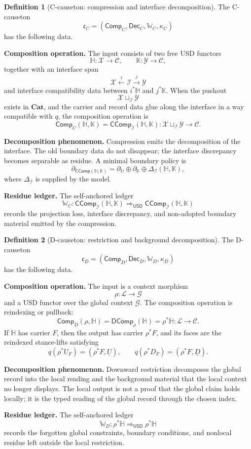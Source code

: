 \documentclass[11pt]{article}
\newcommand{\USD}{\mathsf{USD}}
\newcommand{\CComp}{\mathsf{CComp}}
\newcommand{\DComp}{\mathsf{DComp}}
\newcommand{\Comp}{\mathsf{Comp}}
\newcommand{\Dec}{\mathsf{Dec}}
\newcommand{\Cat}{\mathbf{Cat}}
\theoremstyle{definition}
\newtheorem{definition}{Definition}[section]
\theoremstyle{plain}
\begin{document}
\begin{definition}[C-causeton: compression and interface decomposition]
The C-causeton
\[
  \mathfrak c_C
  =
  (\Comp_C,\Dec_C,\mathbb W_C,\kappa_C)
\]
has the following data.

\textbf{Composition operation.}  The input consists of two free USD
functors
\[
  \mathbb H:\mathcal X\to\mathcal C,
  \qquad
  \mathbb K:\mathcal Y\to\mathcal C,
\]
together with an interface span
\[
  \mathcal X\xleftarrow{i}\mathcal I\xrightarrow{j}\mathcal Y
\]
and interface compatibility data between $i^*\mathbb H$ and
$j^*\mathbb K$.  When the pushout
\[
  \mathcal X\sqcup_{\mathcal I}\mathcal Y
\]
exists in $\Cat$, and the carrier and record data glue along the
interface in a way compatible with $q$, the composition operation is
\[
  \Comp_C(\mathbb H,\mathbb K)
  =
  \CComp_{\mathcal I}(\mathbb H,\mathbb K):
  \mathcal X\sqcup_{\mathcal I}\mathcal Y\to\mathcal C.
\]

\textbf{Decomposition phenomenon.}  Compression emits the decomposition
of the interface.  The old boundary data do not disappear; the interface
discrepancy becomes separable as residue.  A minimal boundary policy is
\[
  \partial_{\CComp(\mathbb H,\mathbb K)}
  =
  \partial_{\mathbb H}\oplus
  \partial_{\mathbb K}\oplus
  \Delta_{\mathcal I}(\mathbb H,\mathbb K),
\]
where $\Delta_{\mathcal I}$ is supplied by the model.

\textbf{Residue ledger.}  The self-anchored ledger
\[
  \mathbb W_C:
  \CComp_{\mathcal I}(\mathbb H,\mathbb K)
  \Rightarrow_{\USD}
  \CComp_{\mathcal I}(\mathbb H,\mathbb K)
\]
records the projection loss, interface discrepancy, and non-adopted
boundary material emitted by the compression.
\end{definition}

\begin{definition}[D-causeton: restriction and background decomposition]
The D-causeton
\[
  \mathfrak c_D
  =
  (\Comp_D,\Dec_D,\mathbb W_D,\kappa_D)
\]
has the following data.

\textbf{Composition operation.}  The input is a context morphism
\[
  \rho:\mathcal L\to\mathcal G
\]
and a USD functor over the global context $\mathcal G$.  The composition
operation is reindexing or pullback:
\[
  \Comp_D(\rho,\mathbb H)
  =
  \DComp_{\rho}(\mathbb H)
  =
  \rho^*\mathbb H:
  \mathcal L\to\mathcal C.
\]
If $\mathbb H$ has carrier $F$, then the output has carrier $\rho^*F$,
and its faces are the reindexed stance-lifts satisfying
\[
  q(\rho^*U_F)=(\rho^*F,\underline U),
  \qquad
  q(\rho^*D_F)=(\rho^*F,\underline D).
\]

\textbf{Decomposition phenomenon.}  Downward restriction decomposes the
global record into the local reading and the background material that the
local context no longer displays.  The local output is not a proof that the
global claim holds locally; it is the typed reading of the global record
through the chosen index.

\textbf{Residue ledger.}  The self-anchored ledger
\[
  \mathbb W_D:
  \rho^*\mathbb H\Rightarrow_{\USD}\rho^*\mathbb H
\]
records the forgotten global constraints, boundary conditions, and
nonlocal residue left outside the local restriction.
\end{definition}
\end{document}
